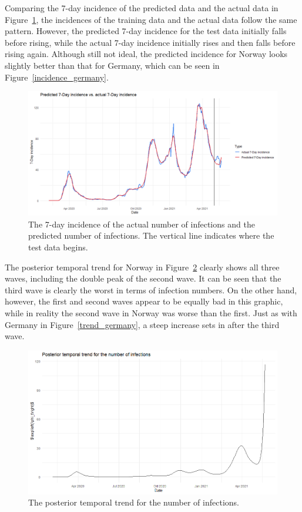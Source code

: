Comparing the 7-day incidence of the predicted data and the actual data in Figure~\ref{incidence_norway}, the incidences of the training data and the actual data follow the same pattern. However, the predicted 7-day incidence for the test data initially falls before rising, while the actual 7-day incidence initially rises and then falls before rising again. Although still not ideal, the predicted incidence for Norway looks slightly better than that for Germany, which can be seen in Figure~\ref{incidence_germany}.
\begin{figure}[H]
  \centering
  \includegraphics[width = \textwidth]{incidence_norway.png}  
  \caption{The 7-day incidence of the actual number of infections and the predicted number of infections. The vertical line indicates where the test data begins.}
  \label{incidence_norway}
\end{figure}
The posterior temporal trend for Norway in Figure~\ref{trend_norway} clearly shows all three waves, including the double peak of the second wave. It can be seen that the third wave is clearly the worst in terms of infection numbers. On the other hand, however, the first and second waves appear to be equally bad in this graphic, while in reality the second wave in Norway was worse than the first. Just as with Germany in Figure~\ref{trend_germany}, a steep increase sets in after the third wave.
\begin{figure}[H]
  \centering
  \includegraphics[width = \textwidth]{temp_trend_norway.png}  
  \caption{The posterior temporal trend for the number of infections.}
  \label{trend_norway}
\end{figure}
